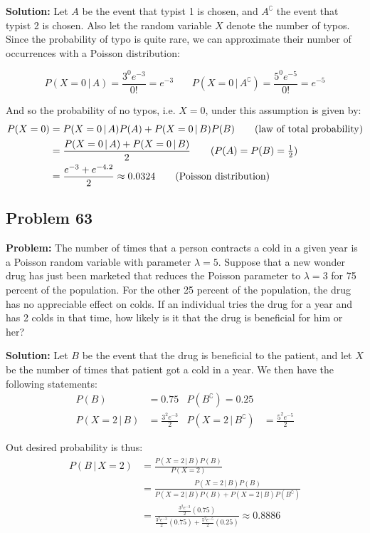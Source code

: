 \documentclass{article}
\newcommand*\pbar[0]{\,|\,}
\begin{document}
\noindent\textbf{Solution:} Let $A$ be the event that typist 1 is chosen, and $A^\complement$ the event that typist 2 is chosen. Also let the random variable $X$ denote the number of typos. Since the probability of typo is quite rare, we can approximate their number of occurrences with a Poisson distribution:

\begin{equation*}
    P(X=0\pbar A)=\frac{3^0e^{-3}}{0!}=e^{-3}\,\,\,\,\,\,\,\,\,\,\,P(X=0\pbar A^\complement)=\frac{5^0e^{-5}}{0!}=e^{-5}
\end{equation*}

And so the probability of no typos, i.e. $X=0$, under this assumption is given by:
\begin{align*}
    P(X=0)&=P(X=0\pbar A)P(A)+P(X=0\pbar B)P(B)\tag{law of total probability}\\
    &=\frac{P(X=0\pbar A)+P(X=0\pbar B)}{2}\tag{$P(A)=P(B)=\frac{1}{2}$}\\
    &=\frac{e^{-3}+e^{-4.2}}{2}\approx0.0324\tag{Poisson distribution}
\end{align*}

\subsection*{Problem 63}
\noindent\textbf{Problem:} The number of times that a person contracts a cold in a given year is a Poisson random variable with parameter $\lambda=5$. Suppose that a new wonder drug has just been marketed that reduces the Poisson parameter to $\lambda=3$ for 75 percent of the population. For the other 25 percent of the population, the drug has no appreciable effect on colds. If an individual tries the drug for a year and has 2 colds in that time, how likely is it that the drug is beneficial for him or her?
\bigskip

\noindent\textbf{Solution:} Let $B$ be the event that the drug is beneficial to the patient, and let $X$ be the number of times that patient got a cold in a year. We then have the following statements:
\begin{align*}
    P(B)&=0.75 & P(B^\complement)=0.25\\
    P(X=2\pbar B)&=\frac{3^2e^{-3}}{2} & P(X=2\pbar B^\complement)&=\frac{5^2e^{-5}}{2}
\end{align*}

Out desired probability is thus:
\begin{align*}
    P(B\pbar X=2)&=\frac{P(X=2\pbar B)P(B)}{P(X=2)}\tag{Bayes' theorem}\\
    &=\frac{P(X=2\pbar B)P(B)}{P(X=2\pbar B)P(B)+P(X=2\pbar B)P(B^\complement)}\tag{law of total probability}\\
    &=\frac{\frac{3^2e^{-3}}{2}(0.75)}{\frac{3^2e^{-3}}{2}(0.75)+\frac{5^2e^{-5}}{2}(0.25)}\approx0.8886
\end{align*}
\end{document}

